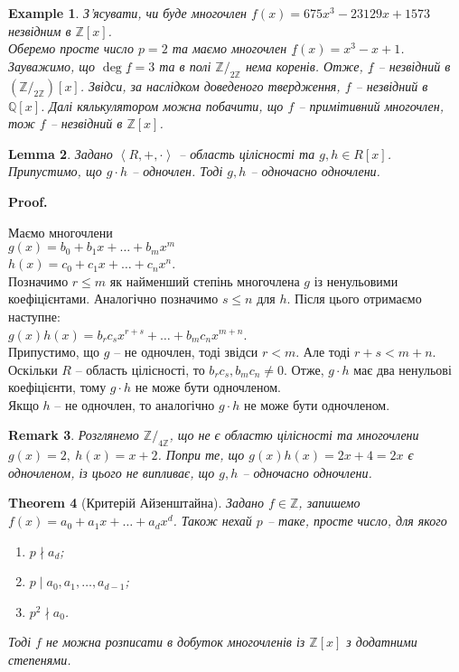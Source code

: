\documentclass[a4paper, 10pt]{article}
\makeatletter
\theoremstyle{theoremdd}
\newtheorem{theorem}{Theorem}[subsection]
\theoremstyle{theoremdd}
\theoremstyle{theoremdd}
\theoremstyle{theoremdd}
\theoremstyle{theoremdd}
\newtheorem{example}[theorem]{Example}
\theoremstyle{theoremdd}
\theoremstyle{theoremdd}
\theoremstyle{theoremdd}
\theoremstyle{theoremdd}
\theoremstyle{theoremdd}
\theoremstyle{theoremdd}
\newtheorem{remark}[theorem]{Remark}
\theoremstyle{theoremdd}
\theoremstyle{theoremdd}
\newtheorem{lemma}[theorem]{Lemma}
\theoremstyle{theoremdd}
\theoremstyle{theoremdd}
\renewenvironment{proof}[1][Proof.\\]{\par
\pushQED{\hfill \qed}%
\normalfont \topsep6\p@\@plus6\p@\relax
\trivlist
\item\relax
{\bfseries
#1\@addpunct{.}}\hspace\labelsep\ignorespaces
}{%
\popQED\endtrivlist\@endpefalse
}
\makeatother
\begin{document}
\begin{example}
З'ясувати, чи буде многочлен $f(x) = 675x^3 - 23129x + 1573$ незвідним в $\mathbb{Z}[x]$.\\
Оберемо просте число $p = 2$ та маємо многочлен $\underline{f}(x) = x^3 - x + 1$. Зауважимо, що $\deg \underline{f} = 3$ та в полі $\mathbb{Z}/_{2 \mathbb{Z}}$ нема коренів. Отже, $\underline{f}$ -- незвідний в $\left(\mathbb{Z}/_{2 \mathbb{Z}}\right)[x]$. Звідси, за наслідком доведеного твердження, $f$ -- незвідний в $\mathbb{Q}[x]$. Далі кялькулятором можна побачити, що $f$ -- примітивний многочлен, тож $f$ -- незвідний в $\mathbb{Z}[x]$.
\end{example}

\begin{lemma}
Задано $\left< R, + ,\cdot \right>$ -- область цілісності та $g,h \in R[x]$. Припустимо, що $g \cdot h$ -- одночлен. Тоді $g,h$ -- одночасно одночлени. 
\end{lemma}

\begin{proof}
Маємо многочлени\\
$g(x) = b_0 + b_1 x + \dots + b_m x^m$\\
$h(x) = c_0 + c_1 x + \dots + c_n x^n$.\\
Позначимо $r \leq m$ як найменший степінь многочлена $g$ із ненульовими коефіцієнтами. Аналогічно позначимо $s \leq n$ для $h$. Після цього отримаємо наступне:\\
$g(x)h(x) = b_r c_s x^{r+s} + \dots + b_m c_n x^{m+n}$.\\
Припустимо, що $g$ -- не одночлен, тоді звідси $r < m$. Але тоді $r+s < m+n$. Оскільки $R$ -- область цілісності, то $b_r c_s, b_m c_n \neq 0$. Отже, $g \cdot h$ має два ненульові коефіцієнти, тому $g \cdot h$ не може бути одночленом.\\
Якщо $h$ -- не одночлен, то аналогічно $g \cdot h$ не може бути одночленом.
\end{proof}

\begin{remark}
Розглянемо $\mathbb{Z}/_{4 \mathbb{Z}}$, що не є областю цілісності та многочлени $g(x) = 2,\ h(x) = x+2$. Попри те, що $g(x)h(x) = 2x + 4 = 2x$ є одночленом, із цього не випливає, що $g,h$ -- одночасно одночлени.
\end{remark}

\begin{theorem}[Критерій Айзенштайна]
Задано $f \in \mathbb{Z}$, запишемо $f(x) = a_0 + a_1 x + \dots + a_d x^d$. Також нехай $p$ -- таке, просте число, для якого
\begin{enumerate}[nosep, wide=0pt, label={\arabic*)}]
\item $p \nmid a_d$;
\item $p \mid a_0,a_1,\dots,a_{d-1}$;
\item $p^2 \nmid a_0$.
\end{enumerate}
Тоді $f$ не можна розписати в добуток многочленів із $\mathbb{Z}[x]$ з додатними степенями.
\end{theorem}
\end{document}
